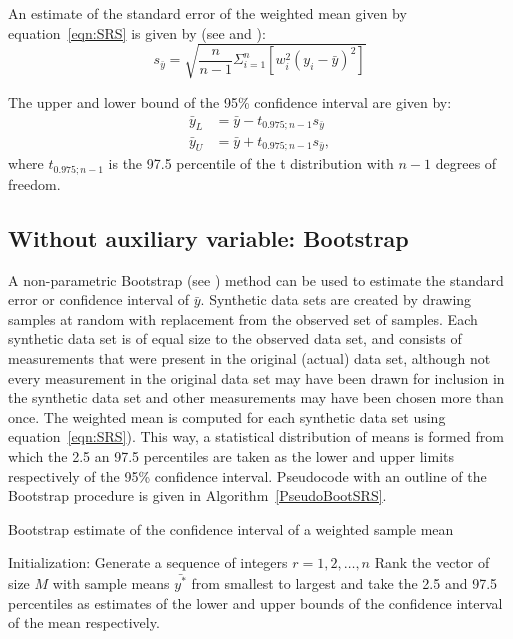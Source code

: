An estimate of the standard error of the weighted mean given by equation~\ref{eqn:SRS} is given by (see \cite{GATZ19951185} and \cite{Cochran77}):
\begin{equation}\label{eqn:varSRS}
s_{\bar{y}}=\sqrt{\frac{n}{n-1} \Sigma_{i=1}^{n}[w_i^2 (y_i-\bar{y})^2]}
\end{equation}

The upper and lower bound of the 95\% confidence interval are given by:
\begin{subequations}\label{eqn:ciSRS}
	\begin{align}
	\bar{y}_{L} &= \bar{y}-t_{0.975;n-1}s_{\bar{y}} \\
	\bar{y}_{U} &= \bar{y}+t_{0.975;n-1}s_{\bar{y}} ,
\end{align}
\end{subequations}
where $t_{0.975;n-1}$ is the 97.5 percentile of the t distribution with $n-1$ degrees of freedom.

\subsection{Without auxiliary variable: Bootstrap}\label{SRSBoot}
A non-parametric Bootstrap (see \cite{EfroTibs93}) method can be used to estimate the standard error or confidence interval of $\bar{y}$. Synthetic data sets are created by drawing samples at random with replacement from the observed set of samples. Each synthetic data set is of equal size to the observed data set, and consists of measurements that were present in the original (actual) data set, although not every measurement in the original data set may have been drawn for inclusion in the synthetic data set and other measurements may have been chosen more than once. The weighted mean is computed for each synthetic data set using equation~\ref{eqn:SRS}). This way, a statistical distribution of means is formed from which the 2.5 an 97.5 percentiles are taken as the lower and upper limits respectively of the 95\% confidence interval. Pseudocode with an outline of the Bootstrap procedure is given in Algorithm~\ref{PseudoBootSRS}.

\LinesNumbered
\DontPrintSemicolon
{}
\begin{algorithm}[h] \label{PseudoBootSRS}
	\caption{Bootstrap estimate of the confidence interval of a weighted sample mean}
	Initialization: Generate a sequence of integers $r={1,2,\ldots,n}$\;
	Rank the vector of size $M$ with sample means $\bar{y^*}$ from smallest to largest and take the 2.5 and 97.5 percentiles as estimates of the lower and upper bounds of the confidence interval of the mean respectively.
\end{algorithm}

